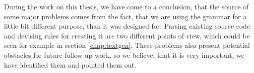 During the work on this thesis, we have come to a conclusion, that the source of some major problems comes from the fact, that we are using the grammar for a little bit different purpose, than it was designed for.
Parsing existing source code and devising rules for creating it are two different points of view, which could be seen for example in section \ref{chap:textgen}.
These problems also present potential obstacles for future follow-up work, so we believe, that it is very important, we have identified them and pointed them out.
